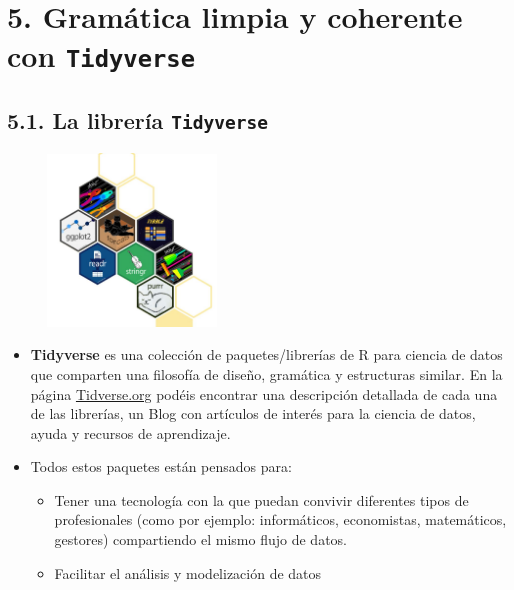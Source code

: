 \documentclass[
  letterpaper,
  DIV=11,
  numbers=noendperiod]{scrreprt}
\begin{document}
\hypertarget{gramuxe1tica-limpia-y-coherente-con-tidyverse}{%
\section{\texorpdfstring{5. Gramática limpia y coherente con
\texttt{Tidyverse}}{5. Gramática limpia y coherente con Tidyverse}}\label{gramuxe1tica-limpia-y-coherente-con-tidyverse}}

\hypertarget{la-libreruxeda-tidyverse}{%
\subsection{\texorpdfstring{5.1. La librería
\texttt{Tidyverse}}{5.1. La librería Tidyverse}}\label{la-libreruxeda-tidyverse}}

\begin{figure}

{\centering \includegraphics[width=0.4\textwidth,height=\textheight]{Figuras/tidyverse-hex.PNG}

}

\end{figure}

\begin{itemize}
\item
  \textbf{Tidyverse} es una colección de paquetes/librerías de R para
  ciencia de datos que comparten una filosofía de diseño, gramática y
  estructuras similar. En la página
  \href{https://www.tidyverse.org/}{Tidverse.org} podéis encontrar una
  descripción detallada de cada una de las librerías, un Blog con
  artículos de interés para la ciencia de datos, ayuda y recursos de
  aprendizaje.
\item
  Todos estos paquetes están pensados para:

  \begin{itemize}
  \item
    Tener una tecnología con la que puedan convivir diferentes tipos de
    profesionales (como por ejemplo: informáticos, economistas,
    matemáticos, gestores) compartiendo el mismo flujo de datos.
  \item
    Facilitar el análisis y modelización de datos
  \end{itemize}
\end{itemize}
\end{document}
